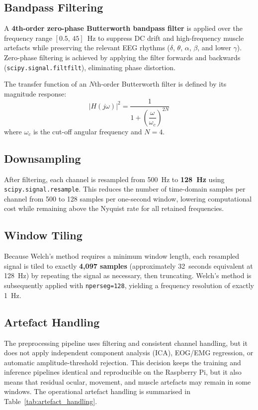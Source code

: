 \documentclass[12pt, a4paper]{report}
\begin{document}
\subsection{Bandpass Filtering}

A \textbf{4th-order zero-phase Butterworth bandpass filter} is applied
over the frequency range $[0.5,\,45]$~Hz to suppress DC drift and
high-frequency muscle artefacts while preserving the relevant
EEG rhythms ($\delta$, $\theta$, $\alpha$, $\beta$, and lower $\gamma$).
Zero-phase filtering is achieved by applying the filter forwards and
backwards (\texttt{scipy.signal.filtfilt}), eliminating phase distortion.

The transfer function of an $N$th-order Butterworth filter is defined by
its magnitude response:
\begin{equation}
  |H(j\omega)|^2 = \frac{1}{1+\left(\dfrac{\omega}{\omega_c}\right)^{2N}}
  \label{eq:butterworth}
\end{equation}
where $\omega_c$ is the cut-off angular frequency and $N=4$.

\subsection{Downsampling}

After filtering, each channel is resampled from 500~Hz to \textbf{128~Hz}
using \texttt{scipy.signal.resample}.
This reduces the number of time-domain samples per channel from 500 to
128 samples per one-second window, lowering computational
cost while remaining above the Nyquist rate for all retained frequencies.

\subsection{Window Tiling}

Because Welch's method requires a minimum window length, each resampled
signal is tiled to exactly \textbf{4{,}097 samples} (approximately
32~seconds equivalent at 128~Hz) by repeating the signal as necessary,
then truncating. Welch's method is subsequently applied with
\texttt{nperseg=128}, yielding a frequency resolution of exactly 1~Hz.

\subsection{Artefact Handling}

The preprocessing pipeline uses filtering and consistent channel handling,
but it does not apply independent component analysis (ICA), EOG/EMG
regression, or automatic amplitude-threshold rejection. This decision keeps
the training and inference pipelines identical and reproducible on the
Raspberry Pi, but it also means that residual ocular, movement, and muscle
artefacts may remain in some windows. The operational artefact handling is
summarised in Table~\ref{tab:artefact_handling}.
\end{document}
